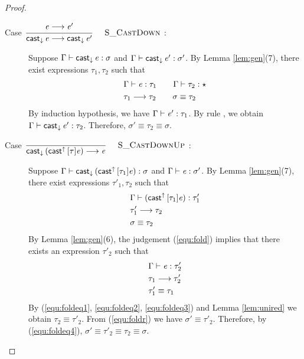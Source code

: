 \begin{proof}
\begin{description}
        \item[Case ${\displaystyle\frac{\begin{array}{l} {\mathit{e} \longrightarrow \mathit{e'}} \end{array}}{ \mathsf{cast}_{\downarrow} \, \mathit{e} \longrightarrow \mathsf{cast}_{\downarrow} \, \mathit{e'}}\quad\textsc{ {\textsc{S\_CastDown}}{} }}$:] $\quad$ \\
        Suppose $\Gamma  \vdash  \mathsf{cast}_{\downarrow} \, \mathit{e}  :  \sigma$ and $\Gamma  \vdash  \mathsf{cast}_{\downarrow} \, \mathit{e'}  :  \sigma'$. By Lemma \ref{lem:gen}(7), there exist expressions $\tau_{{\mathrm{1}}}, \tau_{{\mathrm{2}}}$ such that 
        \begin{align*}
            &\Gamma  \vdash  \mathit{e}  :  \tau_{{\mathrm{1}}} \qquad \Gamma  \vdash  \tau_{{\mathrm{2}}}  :  \star \\
            &\tau_{{\mathrm{1}}}  \longrightarrow  \tau_{{\mathrm{2}}} \qquad \sigma  \equiv  \tau_{{\mathrm{2}}}
        \end{align*}
        By induction hypothesis, we have $\Gamma  \vdash  \mathit{e'}  :  \tau_{{\mathrm{1}}}$. By rule , we obtain $\Gamma  \vdash  \mathsf{cast}_{\downarrow} \, \mathit{e'}  :  \tau_{{\mathrm{2}}}$. Therefore, $\sigma'  \equiv  \tau_{{\mathrm{2}}}  \equiv  \sigma$.
        
        \item[Case ${\displaystyle\frac{\begin{array}{l} \end{array}}{ \mathsf{cast}_{\downarrow} \, ( \mathsf{cast}^{\uparrow} \, [ \tau ] \mathit{e} ) \longrightarrow \mathit{e}}\quad\textsc{ {\textsc{S\_CastDownUp}}{} }}$:] $\quad$ \\
        Suppose $\Gamma  \vdash  \mathsf{cast}_{\downarrow} \, (  \mathsf{cast}^{\uparrow} \, [  \tau_{{\mathrm{1}}}  ]  \mathit{e}  )  :  \sigma$ and $\Gamma  \vdash  \mathit{e}  :  \sigma'$. By Lemma \ref{lem:gen}(7), there exist expressions $\tau'_{{\mathrm{1}}}, \tau_{{\mathrm{2}}}$ such that 
        \begin{align}
            &\Gamma  \vdash  (  \mathsf{cast}^{\uparrow} \, [  \tau_{{\mathrm{1}}}  ]  \mathit{e}  )  :  \tau'_{{\mathrm{1}}} \label{equ:fold} \\
            &\tau'_{{\mathrm{1}}}  \longrightarrow  \tau_{{\mathrm{2}}} \label{equ:foldeq1} \\
            &\sigma  \equiv  \tau_{{\mathrm{2}}} \label{equ:foldeq4}
        \end{align}
        By Lemma \ref{lem:gen}(6), the judgement (\ref{equ:fold}) implies that there exists an expression $\tau'_{{\mathrm{2}}}$ such that
        \begin{align}
            &\Gamma  \vdash  \mathit{e}  :  \tau'_{{\mathrm{2}}} \label{equ:foldr} \\
            &\tau_{{\mathrm{1}}}  \longrightarrow  \tau'_{{\mathrm{2}}} \label{equ:foldeq2} \\
            &\tau'_{{\mathrm{1}}}  \equiv  \tau_{{\mathrm{1}}} \label{equ:foldeq3}
        \end{align}
        By (\ref{equ:foldeq1}, \ref{equ:foldeq2}, \ref{equ:foldeq3}) and Lemma \ref{lem:unired} we obtain $\tau_{{\mathrm{2}}}  \equiv  \tau'_{{\mathrm{2}}}$. From (\ref{equ:foldr}) we have $\sigma'  \equiv  \tau'_{{\mathrm{2}}}$. Therefore, by (\ref{equ:foldeq4}), $\sigma'  \equiv  \tau'_{{\mathrm{2}}}  \equiv  \tau_{{\mathrm{2}}}  \equiv  \sigma$.
        

\end{description}
\end{proof}
